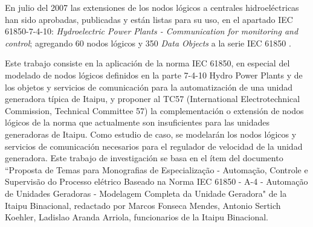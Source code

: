 En julio del 2007 las extensiones de los nodos l\'ogicos a centrales 
hidroel\'ectricas han sido aprobadas, publicadas y est\'an listas 
para su uso, en el apartado IEC 61850-7-4-10: 
\emph{Hydroelectric Power Plants - Communication for monitoring and control}; 
agregando 60 nodos l\'ogicos y 350 \emph{Data Objects} a la serie 
IEC 61850 \cite{IEC61850TC57, Schwarz2008b}.

Este trabajo consiste en la aplicaci\'on de la norma IEC 61850, 
en especial del modelado de nodos l\'ogicos definidos en la parte 
7-4-10 Hydro Power Plants y de los objetos y servicios de comunicaci\'on 
para la automatizaci\'on de una unidad generadora t\'ipica de Itaipu, 
y proponer al TC57 (International Electrotechnical Commission, Technical 
Committee 57) la complementaci\'on o extensi\'on de nodos l\'ogicos de 
la norma que actualmente son insuficientes para las unidades generadoras 
de Itaipu. Como estudio de caso, se modelar\'an los nodos l\'ogicos y 
servicios de comunicaci\'on necesarios para el regulador de velocidad de 
la unidad generadora. Este trabajo de investigaci\'on se basa en el \'item 
del documento ``Proposta de Temas para Monografias de 
Especializa\c c\~ao - Automa\c c\~ao, Controle e Supervis\~ao do 
Processo el\'etrico Baseado na Norma  IEC 61850 -  A-4 - Automa\c c\~ao 
de Unidades Geradoras - Modelagem Completa da Unidade Geradora" de la 
Itaipu Binacional, redactado por Marcos Fonseca Mendes, Antonio Sertich 
Koehler, Ladislao Aranda Arriola, funcionarios de la Itaipu Binacional. 
